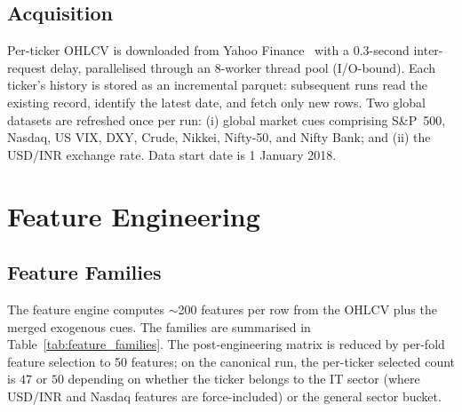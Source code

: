 \subsection{Acquisition}

Per-ticker OHLCV is downloaded from Yahoo Finance~\cite{yfinance} with a 0.3-second inter-request delay, parallelised through an 8-worker thread pool (I/O-bound). Each ticker's history is stored as an incremental parquet: subsequent runs read the existing record, identify the latest date, and fetch only new rows. Two global datasets are refreshed once per run: (i) global market cues comprising S\&P~500, Nasdaq, US VIX, DXY, Crude, Nikkei, Nifty-50, and Nifty Bank; and (ii) the USD/INR exchange rate. Data start date is 1 January 2018.

\section{Feature Engineering}

\subsection{Feature Families}

The feature engine computes \(\sim\)200 features per row from the OHLCV plus the merged exogenous cues. The families are summarised in Table~\ref{tab:feature_families}. The post-engineering matrix is reduced by per-fold feature selection to 50 features; on the canonical run, the per-ticker selected count is $47$ or $50$ depending on whether the ticker belongs to the IT sector (where USD/INR and Nasdaq features are force-included) or the general sector bucket.

